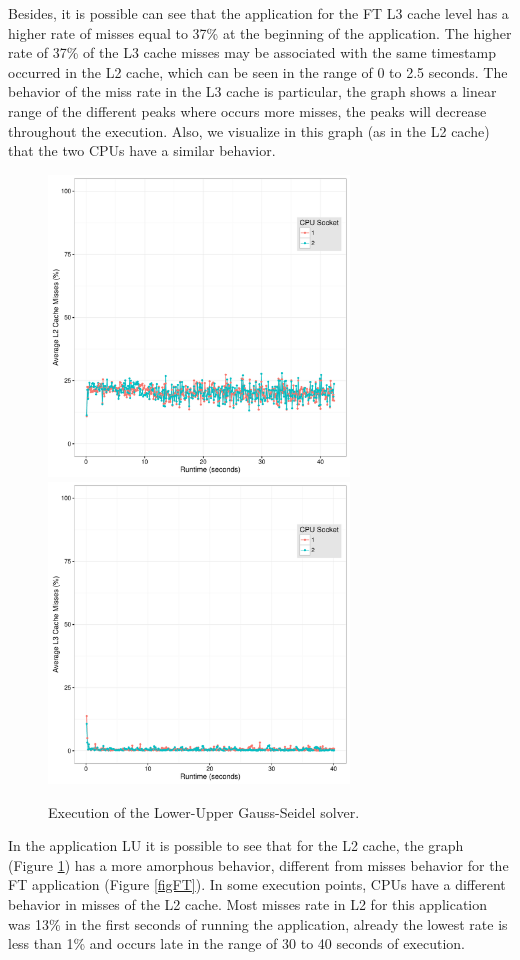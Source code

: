 \documentclass[conference,letter,10pt,final]{IEEEtran}
\begin{document}
Besides, it is possible can see that the application for the FT L3
cache level has a higher rate of misses equal to 37\% at the beginning
of the application. The higher rate of 37\% of the L3 cache misses may
be associated with the same timestamp occurred in the L2 cache, which
can be seen in the range of 0 to 2.5 seconds. The behavior of the miss
rate in the L3 cache is particular, the graph shows a linear range of
the different peaks where occurs more misses, the peaks will decrease
throughout the execution. Also, we visualize in this graph (as in the
L2 cache) that the two CPUs have a similar behavior.


\begin{figure}[htp]\label{figLU}
\centering \includegraphics[width=8cm,height=8cm]{img/luBNas_Analise.pdf}
\centering \includegraphics[width=8cm,height=8cm]{img/luBNas_Analise_l3.pdf}
\caption{Execution of the Lower-Upper Gauss-Seidel solver.}
\end{figure}

In the application LU it is possible to see that for the L2 cache, the
graph (Figure \ref{figLU}) has a more amorphous behavior, different from misses
behavior for the FT application (Figure \ref{figFT}). In some execution points,
CPUs have a different behavior in misses of the L2 cache. Most misses
rate in L2 for this application was 13\% in the first seconds of
running the application, already the lowest rate is less than 1\% and
occurs late in the range of 30 to 40 seconds of execution. 
\end{document}
